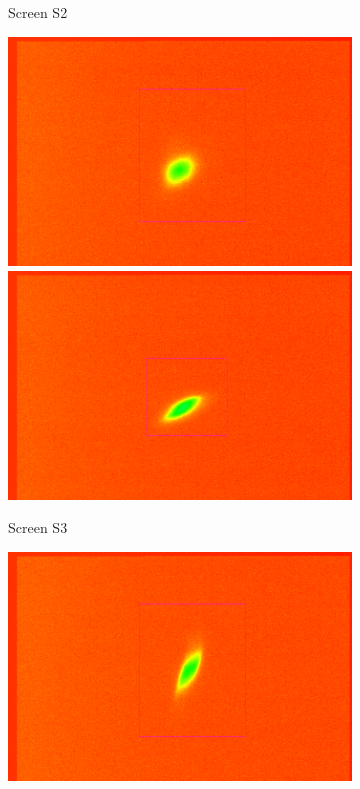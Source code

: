 \documentclass[11pt,a4paper,notitlepage]{scrartcl}
\begin{document}
\begin{figure}[htbp]
\begin{subfigure}{0.19\linewidth}
		\caption{Screen S2}
	\end{subfigure}	\hfill
	\begin{subfigure}{0.19\linewidth}
		\includegraphics[width=\linewidth]{figs/Screens/S3_Eyeball.png}
		\includegraphics[width=\linewidth]{figs/Screens/S3_Calib.png}
		\caption{Screen S3}
	\end{subfigure}	\hfill
	\begin{subfigure}{0.19\linewidth}
		\includegraphics[width=\linewidth]{figs/Screens/S4_Eyeball.png}

\end{subfigure}
\end{figure}
\end{document}
